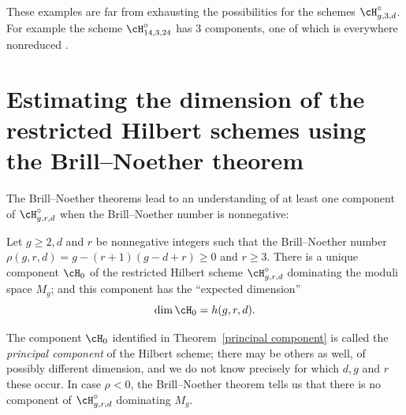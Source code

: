 These examples are far from exhausting the possibilities for the schemes
$\cH^{\circ}_{g,3,d}$. For example
the scheme $\cH^{\circ}_{14,3,24}$ has 3 components, one of which is
%
%
%
everywhere nonreduced \cite{Mumford1962,Nasu2008}.


\section{Estimating the dimension of the restricted Hilbert schemes
using the Brill--Noether theorem}\label{estimating dim hilb}

The
Brill--Noether theorems
lead to an understanding of at least one
%
component of $\cH^{\circ}_{g,r,d}$ when
the
Brill--Noether number
is nonnegative:
%

\begin{theorem}\label{principal component}
Let $g\geq 2, d$ and $r$ be nonnegative integers such that the
Brill--Noether number  $\rho(g,r,d) = g - (r+1)(g-d+r) \geq 0$
and $r\geq 3$.  There is a unique component $\cH_0$ of the restricted
Hilbert scheme $\cH^\circ_{g,r,d}$ dominating the moduli space $M_g$;
and this component has the ``expected dimension''
$$
\dim \cH_0 = h(g,r,d).
$$
\end{theorem}

 The component $\cH_0$ identified in Theorem~\ref{principal component}
 is called the \emph{principal component} of the Hilbert scheme; there
%
 may be others as well, of possibly different dimension, and we do not
 know precisely for which $d,g$ and $r$ these occur. In case $\rho <
 0$, the Brill--Noether theorem tells us that there is no component of
 $\cH^\circ_{g,r,d}$ dominating $M_g$.

